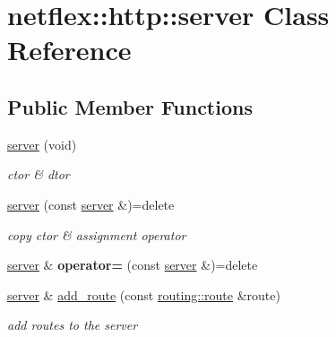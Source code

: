 \hypertarget{classnetflex_1_1http_1_1server}{}\section{netflex\+:\+:http\+:\+:server Class Reference}
\label{classnetflex_1_1http_1_1server}
\subsection*{Public Member Functions}
\begin{DoxyCompactItemize}
\item 
\mbox{\label{classnetflex_1_1http_1_1server_af153788cc4e18c486bf9f5cfaf1d6cc5}} 
\hyperlink{classnetflex_1_1http_1_1server_af153788cc4e18c486bf9f5cfaf1d6cc5}{server} (void)
\begin{DoxyCompactList}\small\item\em ctor \& dtor \end{DoxyCompactList}\item 
\mbox{\label{classnetflex_1_1http_1_1server_ac9ba1d17e987a083f1e4865ed13d3b98}} 
\hyperlink{classnetflex_1_1http_1_1server_ac9ba1d17e987a083f1e4865ed13d3b98}{server} (const \hyperlink{classnetflex_1_1http_1_1server}{server} \&)=delete
\begin{DoxyCompactList}\small\item\em copy ctor \& assignment operator \end{DoxyCompactList}\item 
\mbox{\label{classnetflex_1_1http_1_1server_a9bca5e45a63350039f6af97245129c5a}} 
\hyperlink{classnetflex_1_1http_1_1server}{server} \& {\bfseries operator=} (const \hyperlink{classnetflex_1_1http_1_1server}{server} \&)=delete
\item 
\mbox{\label{classnetflex_1_1http_1_1server_a704f899f913b798d217bf75309043add}} 
\hyperlink{classnetflex_1_1http_1_1server}{server} \& \hyperlink{classnetflex_1_1http_1_1server_a704f899f913b798d217bf75309043add}{add\+\_\+route} (const \hyperlink{classnetflex_1_1routing_1_1route}{routing\+::route} \&route)
\begin{DoxyCompactList}\small\item\em add routes to the server \end{DoxyCompactList}\item 

\end{DoxyCompactItemize}
